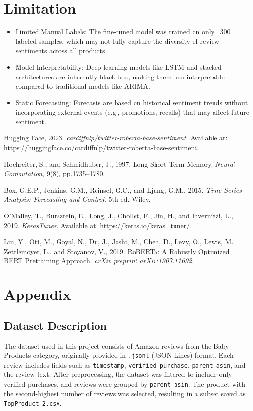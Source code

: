 \documentclass[letterpaper]{article}
\begin{document}
\section{Limitation}
\begin{itemize}
    \item Limited Manual Labels: The fine-tuned model was trained on only ~300 labeled samples, which may not fully capture the diversity of review sentiments across all products.
    \item Model Interpretability: Deep learning models like LSTM and stacked architectures are inherently black-box, making them less interpretable compared to traditional models like ARIMA.
    \item Static Forecasting: Forecasts are based on historical sentiment trends without incorporating external events (e.g., promotions, recalls) that may affect future sentiment.
\end{itemize}


\begin{thebibliography}{9}

Hugging Face, 2023. \emph{cardiffnlp/twitter-roberta-base-sentiment}. Available at: \url{https://huggingface.co/cardiffnlp/twitter-roberta-base-sentiment}.

Hochreiter, S., and Schmidhuber, J., 1997. Long Short-Term Memory. \emph{Neural Computation}, 9(8), pp.1735--1780.

Box, G.E.P., Jenkins, G.M., Reinsel, G.C., and Ljung, G.M., 2015. \emph{Time Series Analysis: Forecasting and Control}. 5th ed. Wiley.

O'Malley, T., Bursztein, E., Long, J., Chollet, F., Jin, H., and Invernizzi, L., 2019. \emph{KerasTuner}. Available at: \url{https://keras.io/keras_tuner/}.

Liu, Y., Ott, M., Goyal, N., Du, J., Joshi, M., Chen, D., Levy, O., Lewis, M., Zettlemoyer, L., and Stoyanov, V., 2019. RoBERTa: A Robustly Optimized BERT Pretraining Approach. \emph{arXiv preprint arXiv:1907.11692}.

\end{thebibliography}
\section{Appendix}
\subsection{Dataset Description}
The dataset used in this project consists of Amazon reviews from the Baby Products category, originally provided in \texttt{.jsonl} (JSON Lines) format. Each review includes fields such as \texttt{timestamp}, \texttt{verified\_purchase}, \texttt{parent\_asin}, and the review text. After preprocessing, the dataset was filtered to include only verified purchases, and reviews were grouped by \texttt{parent\_asin}. The product with the second-highest number of reviews was selected, resulting in a subset saved as \texttt{TopProduct\_2.csv}.
\end{document}
